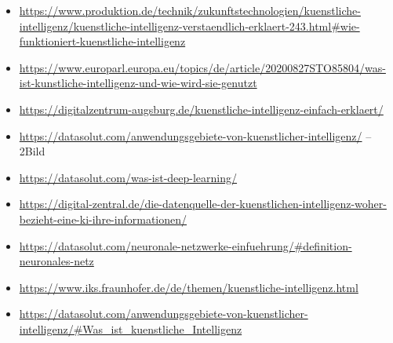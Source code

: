 \documentclass{report}
\begin{document}
\begin{itemize}
\item \url{https://www.produktion.de/technik/zukunftstechnologien/kuenstliche-intelligenz/kuenstliche-intelligenz-verstaendlich-erklaert-243.html#wie-funktioniert-kuenstliche-intelligenz}
\item \url{https://www.europarl.europa.eu/topics/de/article/20200827STO85804/was-ist-kunstliche-intelligenz-und-wie-wird-sie-genutzt}
\item \url{https://digitalzentrum-augsburg.de/kuenstliche-intelligenz-einfach-erklaert/}
\item \url{https://datasolut.com/anwendungsgebiete-von-kuenstlicher-intelligenz/} -- 2Bild
\item \url{https://datasolut.com/was-ist-deep-learning/} 
\item \url{https://digital-zentral.de/die-datenquelle-der-kuenstlichen-intelligenz-woher-bezieht-eine-ki-ihre-informationen/}
\item \url{https://datasolut.com/neuronale-netzwerke-einfuehrung/#definition-neuronales-netz}
\item \url{https://www.iks.fraunhofer.de/de/themen/kuenstliche-intelligenz.html}
\item \url{https://datasolut.com/anwendungsgebiete-von-kuenstlicher-intelligenz/#Was_ist_kuenstliche_Intelligenz}
\end{itemize}

\printbibliography
\end{document}
